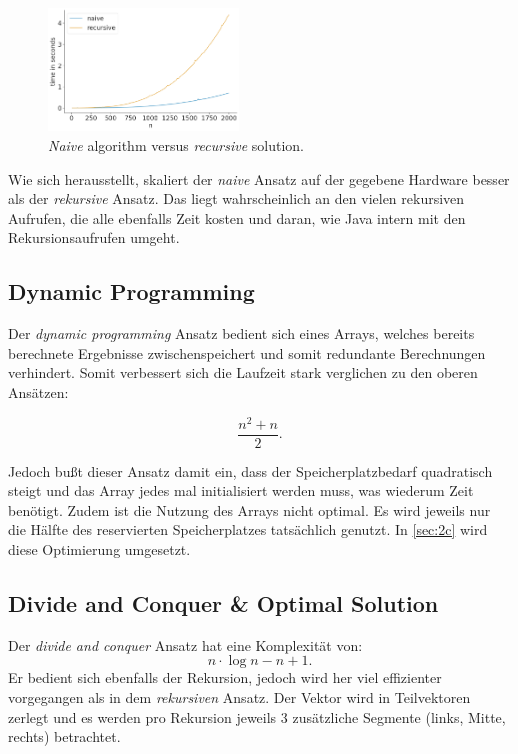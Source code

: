 \documentclass[10pt]{article}
\begin{document}
    \begin{figure}[ht]
        \centering
        \includegraphics[width=0.45\textwidth]{../naive_vs_rec_times.png}
        \caption{\textit{Naive} algorithm versus \textit{recursive} solution.}
        \label{fig:naiv_vs_rec}
    \end{figure}

        \newpage
    Wie sich herausstellt, skaliert der \textit{naive} Ansatz auf der gegebene Hardware besser als der \textit{rekursive} Ansatz.
    Das liegt wahrscheinlich an den vielen rekursiven Aufrufen, die alle ebenfalls Zeit kosten und daran, wie Java 
    intern mit den Rekursionsaufrufen umgeht. 

    \subsection{Dynamic Programming}\label{sec:dynamic}
    Der \textit{dynamic programming} Ansatz bedient sich eines Arrays, welches bereits berechnete Ergebnisse zwischenspeichert und somit
    redundante Berechnungen verhindert. Somit verbessert sich die Laufzeit stark verglichen zu den oberen Ansätzen:

    \[
        \frac{n^{2}+n}{2} 
    .\]

    Jedoch bu\ss t dieser Ansatz damit ein, dass der Speicherplatzbedarf quadratisch steigt und das Array jedes mal 
    initialisiert werden muss, was wiederum Zeit benötigt. Zudem ist die Nutzung des Arrays nicht optimal. Es wird jeweils nur die 
    Hälfte des reservierten Speicherplatzes tatsächlich genutzt. In \ref{sec:2c} wird diese Optimierung 
    umgesetzt.

    \subsection{Divide and Conquer \& Optimal Solution}
    Der \textit{divide and conquer} Ansatz hat eine Komplexität von:
    \[
       n \cdot \log n - n + 1 
    .\]
    Er bedient sich ebenfalls der Rekursion, jedoch wird her viel effizienter vorgegangen als in dem \textit{rekursiven} Ansatz.
    Der Vektor wird in Teilvektoren zerlegt und es werden pro Rekursion jeweils 3 zusätzliche Segmente (links, Mitte, rechts) betrachtet. 
    
\end{document}
